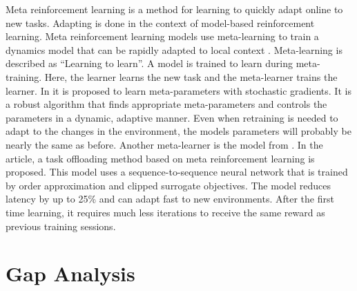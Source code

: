 Meta reinforcement learning is a method for learning to quickly adapt online
to new tasks. Adapting is done in the context of model-based reinforcement
learning. Meta reinforcement learning models use meta-learning to train a
dynamics model that can be rapidly adapted to local context
\cite{nagabandi2019}. Meta-learning is described as ``Learning to learn''. A
model is trained to learn during meta-training. Here, the learner learns the new
task and the meta-learner trains the learner. In \cite{schweighofer2003} it is
proposed to learn meta-parameters with stochastic gradients. It is a robust
algorithm that finds appropriate meta-parameters and controls the parameters
in a dynamic, adaptive manner. Even when retraining is needed to adapt to the
changes in the environment, the models parameters will probably be nearly the
same as before. Another meta-learner is the \mrlco model from
. In the article, a task offloading method based on meta
reinforcement learning is proposed. This model uses a sequence-to-sequence
neural network that is trained by order approximation and clipped surrogate
objectives. The model reduces latency by up to 25\% and can adapt fast
to new environments. After the first time learning, it requires much less
iterations to receive the same reward as previous training sessions.


\section{Gap Analysis}

